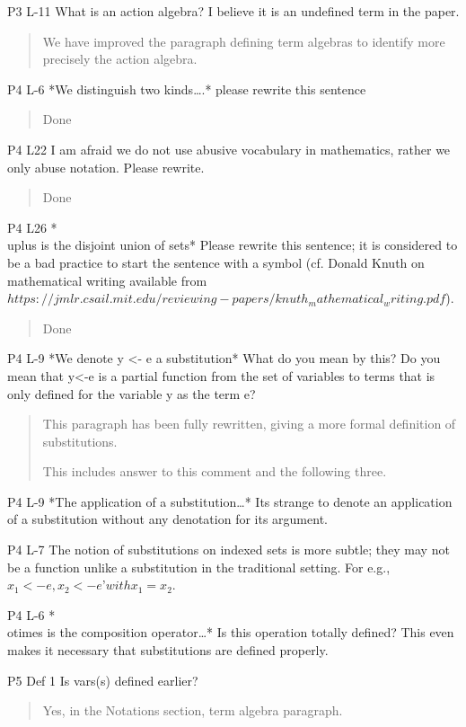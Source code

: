 \documentclass{article}
\begin{document}
P3 L-11 What is an action algebra? I believe it is an undefined term in the paper.
\begin{quote}
We have improved the paragraph defining term algebras to identify more precisely the action algebra.
\end{quote}


P4 L-6 *We distinguish two kinds….* please rewrite this sentence
\begin{quote}
Done
\end{quote}


P4 L22 I am afraid we do not use abusive vocabulary in mathematics, rather we only abuse notation. Please rewrite.
\begin{quote}
Done
\end{quote}

P4 L26 *\\uplus is the disjoint union of sets* Please rewrite this sentence; it is considered to be a bad practice to start the sentence with a symbol (cf. Donald Knuth on mathematical writing available from $https://jmlr.csail.mit.edu/reviewing-papers/knuth_mathematical_writing.pdf$).
\begin{quote}
Done
\end{quote}


P4 L-9 *We denote y <- e a substitution* What do you mean by this? Do you mean that y<-e is a partial function from the set of variables to terms that is only defined for the variable y as the term e?
\begin{quote}
This paragraph has been fully rewritten, giving a more formal definition of substitutions.

This includes answer to this comment and the following three. 
\end{quote}


P4 L-9 *The application of a substitution…* Its strange to denote an application of a substitution without any denotation for its argument.

P4 L-7 The notion of substitutions on indexed sets is more subtle; they may not be a function unlike a substitution in the traditional setting. For e.g., $x_1 <-e, x_2 <-e’ with x_1 = x_2$.

P4 L-6 *\\otimes is the composition operator…* Is this operation totally defined? This even makes it necessary that substitutions are defined properly.

P5 Def 1 Is vars(s) defined earlier?
\begin{quote}
Yes, in the Notations section, term algebra paragraph.
\end{quote}
\end{document}
